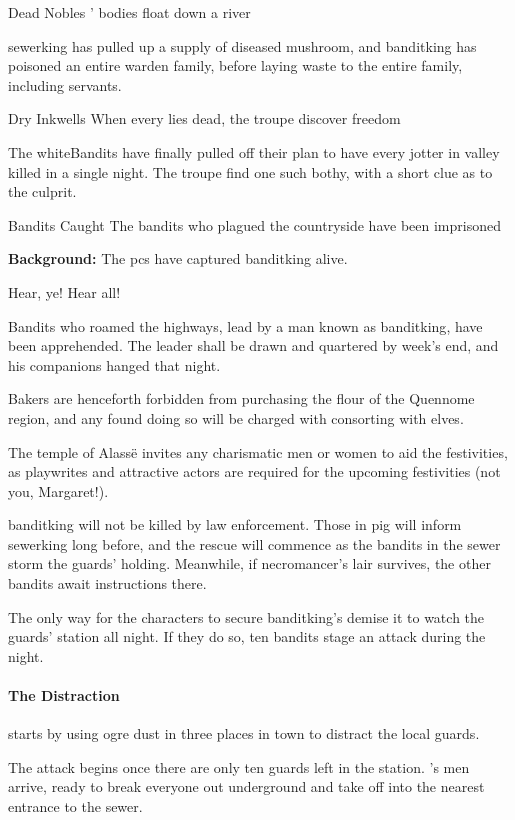 {Dead Nobles}%
{' bodies float down a river}%

\Gls{sewerking} has pulled up a supply of diseased mushroom, and \gls{banditking} has poisoned an entire \gls{warden} family, before laying waste to the entire family, including servants.


{Dry Inkwells}%
{When every  lies dead, the troupe discover freedom}%

The \gls{whiteBandits} have finally pulled off their plan to have every \gls{jotter} in \gls{valley} killed in a single night.
The troupe find one such \gls{bothy}, with a short clue as to the culprit.

{Bandits Caught}%
{The bandits who plagued the countryside have been imprisoned}%

\textbf{Background:}
The \glspl{pc} have captured \gls{banditking} alive.

\begin{boxtext}

  Hear, ye!  Hear all!

  Bandits who roamed the highways, lead by a man known as \gls{banditking}, have been apprehended.  The leader shall be drawn and quartered by week's end, and his companions hanged that night.

  Bakers are henceforth forbidden from purchasing the flour of the Quennome region, and any found doing so will be charged with consorting with elves.

  The temple of Alass\"e invites any charismatic men or women to aid the festivities, as playwrites and attractive actors are required for the upcoming festivities (not you, Margaret!).

\end{boxtext}

\Gls{banditking} will not be killed by law enforcement.
Those in \gls{pig} will inform \gls{sewerking} long before, and the rescue will commence as the bandits in the sewer storm the guards' holding.
Meanwhile, if \gls{necromancer}'s lair survives, the other bandits await instructions there.


The only way for the characters to secure \gls{banditking}'s demise it to watch the guards' station all night.
If they do so, ten bandits stage an attack during the night.

\paragraph{The Distraction} starts by using ogre dust in three places in town to distract the local guards.

The attack begins once there are only ten guards left in the station.
's men arrive, ready to break everyone out underground and take off into the nearest entrance to the sewer.

\stopcontents[sq]


